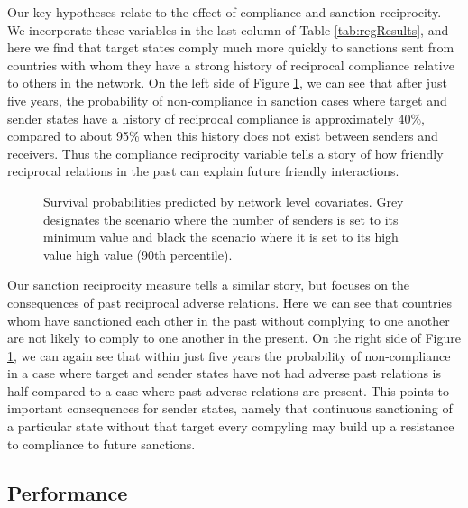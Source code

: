 Our key hypotheses relate to the effect of compliance and sanction reciprocity. We incorporate these variables in the last column of Table \ref{tab:regResults}, and here we find that target states comply much more quickly to sanctions sent from countries with whom they have a strong history of reciprocal compliance relative to others in the network. On the left side of Figure \ref{fig:surv3}, we can see that after just five years, the probability of non-compliance in sanction cases where target and sender states have a history of reciprocal compliance is approximately 40\%, compared to about 95\% when this history does not exist between senders and receivers. Thus the compliance reciprocity variable tells a story of how friendly reciprocal relations in the past can explain future friendly interactions. 


\begin{figure}[ht]
	\centering
	\caption{Survival probabilities predicted by network level covariates. Grey designates the scenario where the number of senders is set to its minimum value and black the scenario where it is set to its high value high value (90th percentile).}
	\resizebox{1\textwidth}{!}{}	
	\label{fig:surv3}	
\end{figure}


Our sanction reciprocity measure tells a similar story, but focuses on the consequences of past reciprocal adverse relations. Here we can see that countries whom have sanctioned each other in the past without complying to one another are not likely to comply to one another in the present. On the right side of Figure \ref{fig:surv3}, we can again see that within just five years the probability of non-compliance in a case where target and sender states have not had adverse past relations is half compared to a case where past adverse relations are present. This points to important consequences for sender states, namely that continuous sanctioning of a particular state without that target every compyling  may build up a resistance to compliance to future sanctions. 

\subsection*{Performance}

